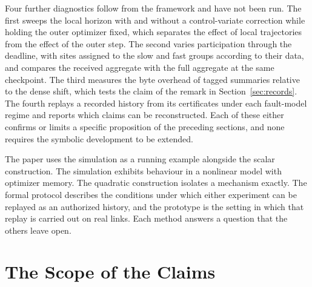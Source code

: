 \documentclass[11pt]{article}
\theoremstyle{definition}
\theoremstyle{remark}
\begin{document}
Four further diagnostics follow from the framework and have not been run. The first sweeps the local horizon with and without a control-variate correction while holding the outer optimizer fixed, which separates the effect of local trajectories from the effect of the outer step. The second varies participation through the deadline, with sites assigned to the slow and fast groups according to their data, and compares the received aggregate with the full aggregate at the same checkpoint. The third measures the byte overhead of tagged summaries relative to the dense shift, which tests the claim of the remark in Section~\ref{sec:records}. The fourth replays a recorded history from its certificates under each fault-model regime and reports which claims can be reconstructed. Each of these either confirms or limits a specific proposition of the preceding sections, and none requires the symbolic development to be extended.

The paper uses the simulation as a running example alongside the scalar construction. The simulation exhibits behaviour in a nonlinear model with optimizer memory. The quadratic construction isolates a mechanism exactly. The formal protocol describes the conditions under which either experiment can be replayed as an authorized history, and the prototype is the setting in which that replay is carried out on real links. Each method answers a question that the others leave open.

\section{The Scope of the Claims}
\end{document}
